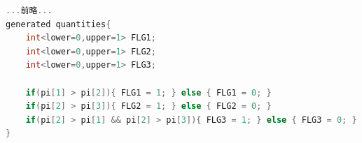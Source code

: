 \begin{lstlisting}[language=C++,label={stan::23_02},caption={多項分布からのデータ生成モデル}]
...前略...
generated quantities{
    int<lower=0,upper=1> FLG1;
    int<lower=0,upper=1> FLG2;
    int<lower=0,upper=1> FLG3;
    
    if(pi[1] > pi[2]){ FLG1 = 1; } else { FLG1 = 0; }
    if(pi[2] > pi[3]){ FLG2 = 1; } else { FLG2 = 0; }
    if(pi[2] > pi[1] && pi[2] > pi[3]){ FLG3 = 1; } else { FLG3 = 0; }
}
\end{lstlisting}
